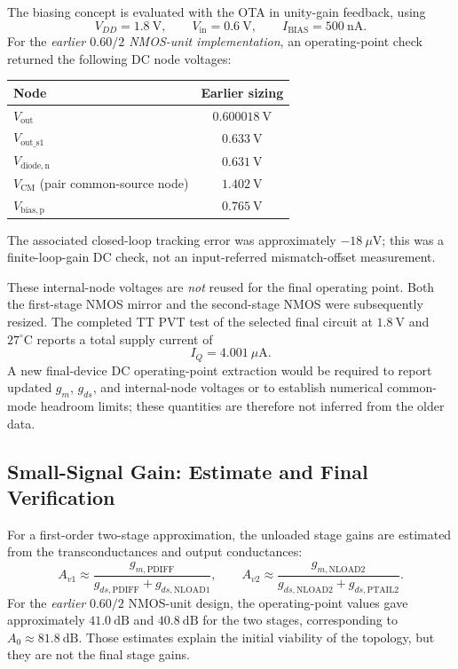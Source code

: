 The biasing concept is evaluated with the OTA in unity-gain feedback,
using
\[
V_{DD}=1.8~\mathrm{V},\qquad
V_{\mathrm{in}}=0.6~\mathrm{V},\qquad
I_{\mathrm{BIAS}}=500~\mathrm{nA}.
\]
For the \emph{earlier $0.60/2$ NMOS-unit implementation}, an
operating-point check returned the following DC node voltages:
\begin{center}
\begin{tabular}{lc}
\hline
Node & Earlier sizing \\
\hline
$V_{\mathrm{out}}$ & $0.600018~\mathrm{V}$ \\
$V_{\mathrm{out\_s1}}$ & $0.633~\mathrm{V}$ \\
$V_{\mathrm{diode,n}}$ & $0.631~\mathrm{V}$ \\
$V_{\mathrm{CM}}$ (pair common-source node) & $1.402~\mathrm{V}$ \\
$V_{\mathrm{bias,p}}$ & $0.765~\mathrm{V}$ \\
\hline
\end{tabular}
\end{center}
The associated closed-loop tracking error was approximately
$-18~\mu\mathrm{V}$; this was a finite-loop-gain DC check, not an
input-referred mismatch-offset measurement.

These internal-node voltages are \emph{not} reused for the final
operating point. Both the first-stage NMOS mirror and the second-stage
NMOS were subsequently resized. The completed TT PVT test of the
selected final circuit at $1.8~\mathrm{V}$ and
$27^\circ\mathrm{C}$ reports a total supply current of
\[
\boxed{I_Q=4.001~\mu\mathrm{A}.}
\]
A new final-device DC operating-point extraction would be required
to report updated $g_m$, $g_{ds}$, and internal-node voltages or to
establish numerical common-mode headroom limits; these quantities are
therefore not inferred from the older data.

\subsection{Small-Signal Gain: Estimate and Final Verification}

For a first-order two-stage approximation, the unloaded stage gains
are estimated from the transconductances and output conductances:
\[
A_{v1}\approx
\frac{g_{m,\mathrm{PDIFF}}}
{g_{ds,\mathrm{PDIFF}}+g_{ds,\mathrm{NLOAD1}}},\qquad
A_{v2}\approx
\frac{g_{m,\mathrm{NLOAD2}}}
{g_{ds,\mathrm{NLOAD2}}+g_{ds,\mathrm{PTAIL2}}}.
\]
For the \emph{earlier} $0.60/2$ NMOS-unit design, the operating-point
values gave approximately $41.0~\mathrm{dB}$ and
$40.8~\mathrm{dB}$ for the two stages, corresponding to
$A_0\approx81.8~\mathrm{dB}$. Those estimates explain the initial
viability of the topology, but they are not the final stage gains.

